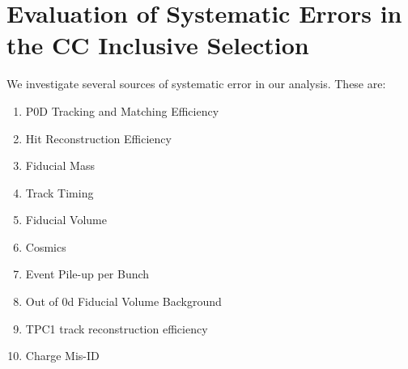 \section{Evaluation of Systematic Errors in the CC Inclusive Selection}
\label{sec:Systematics}

We investigate several sources of systematic error in our analysis. These are:

\begin{enumerate}
\item P0D Tracking and Matching Efficiency
\item Hit Reconstruction Efficiency
\item Fiducial Mass
\item Track Timing
\item Fiducial Volume
\item Cosmics
\item Event Pile-up per Bunch
\item Out of \p0d Fiducial Volume Background
\item TPC1 track reconstruction efficiency
\item Charge Mis-ID
\\
\end{enumerate}
